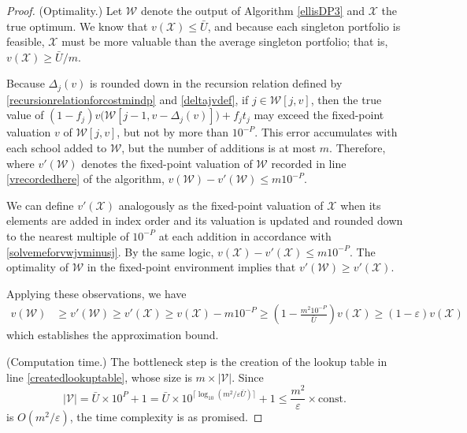 \documentclass[11pt]{article} %
\theoremstyle{definition}
\theoremstyle{definition}
\begin{document}
\begin{proof}
(Optimality.) Let $\mathcal{W}$ denote the output of Algorithm \ref{ellisDP3} and $\mathcal{X}$ the true optimum. We know that $v(\mathcal{X}) \leq \bar U$, and because each singleton portfolio is feasible, $\mathcal{X}$ must be more valuable than the average singleton portfolio; that is, $v(\mathcal{X}) \geq \bar U / m$. 

Because $\Delta_j(v)$ is rounded down in the recursion relation defined by \eqref{recursionrelationforcostmindp} and \eqref{deltajvdef}, if $j \in \mathcal{W}[j, v]$, then the true value of $(1 - f_j) v\bigl(\mathcal{W}[j-1, v- \Delta_j(v)]\bigr) + f_j t_j$ may exceed the fixed-point valuation $v$ of $\mathcal{W}[j, v]$, but not by more than $10^{-P}$. This error accumulates with each school added to $\mathcal{W}$, but the number of additions is at most $m$. Therefore, where $v'(\mathcal{W})$ denotes the fixed-point valuation of $\mathcal{W}$ recorded in line \ref{vrecordedhere} of the algorithm, 
$v(\mathcal{W}) - v'(\mathcal{W}) \leq m 10^{-P}$.

We can define $v'(\mathcal{X})$ analogously as the fixed-point valuation of $\mathcal{X}$ when its elements are added in index order and its valuation is updated and rounded down to the nearest multiple of $10^{-P}$ at each addition in accordance with \eqref{solvemeforvwjvminusj}. By the same logic, 
$v(\mathcal{X}) - v'(\mathcal{X}) \leq m 10^{-P}$. The optimality of $\mathcal{W}$ in the fixed-point environment implies that $v'(\mathcal{W}) \geq v'(\mathcal{X})$. 

Applying these observations, we have
\begin{equation}
\begin{split}
v(\mathcal{W}) &\geq v'(\mathcal{W}) \geq v'(\mathcal{X})
\geq v(\mathcal{X}) - m 10^{-P}
\geq \left(1 - \frac{m^2 10^{-P}}{\bar U}\right) v(\mathcal{X})
\geq \left(1 - \varepsilon\right) v(\mathcal{X})
\end{split}
\end{equation}
which establishes the approximation bound. 

(Computation time.) The bottleneck step is the creation of the lookup table in line \ref{createdlookuptable}, whose size is $m \times |\mathcal{V}|$. Since
\begin{equation}
|\mathcal{V}| = \bar U \times 10^{P} + 1 = \bar U \times 10^ { \bigl\lceil\log_{10}\left(m ^2/ \varepsilon \bar U\right)\bigr\rceil} + 1
\leq\frac{m^2}{\varepsilon} \times \text{const.}
\end{equation}
is $O(m^2/ \varepsilon)$, the time complexity is as promised. %
\end{proof}
\end{document}
